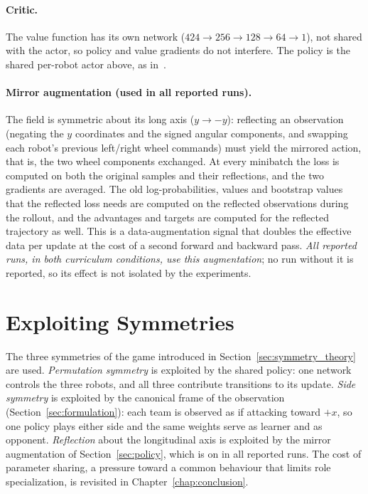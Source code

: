 \paragraph{Critic.}
The value function has its own network ($424\to256\to128\to64\to1$), not shared with the actor, so
policy and value gradients do not interfere.  The policy is the shared per-robot actor above, as in~\cite{brandao2022}.

\paragraph{Mirror augmentation (used in all reported runs).}
The field is symmetric about its long axis ($y\to-y$): reflecting an observation (negating the $y$ coordinates and the signed angular components, and swapping each robot's previous
left/right wheel commands) must yield the mirrored action, that is, the two wheel components exchanged.  At every minibatch the loss is computed on both the original samples and their reflections, and the two gradients are averaged.  The
old log-probabilities, values and bootstrap values that the reflected loss needs are computed on the reflected observations during the rollout, and the advantages and targets are computed for the reflected trajectory as well.  This is a
data-augmentation signal that doubles the effective data per update at the cost of a second forward and backward pass.  \emph{All reported runs, in both curriculum conditions, use this augmentation}; no run without it is reported, so its effect is not isolated by the experiments.

\section{Exploiting Symmetries}
\label{sec:symmetries}

The three symmetries of the game introduced in Section~\ref{sec:symmetry_theory} are used.  \emph{Permutation symmetry} is exploited by the shared policy: one network
controls the three robots, and all three contribute transitions to its update.  \emph{Side symmetry} is exploited by the canonical frame of the observation
(Section~\ref{sec:formulation}): each team is observed as if attacking toward $+x$, so one policy plays either side and the same weights serve as learner and as opponent.
\emph{Reflection} about the longitudinal axis is exploited by the mirror augmentation of Section~\ref{sec:policy}, which is on in all reported runs.  The cost of parameter sharing, a pressure toward a common behaviour that limits
role specialization, is revisited in Chapter~\ref{chap:conclusion}.

